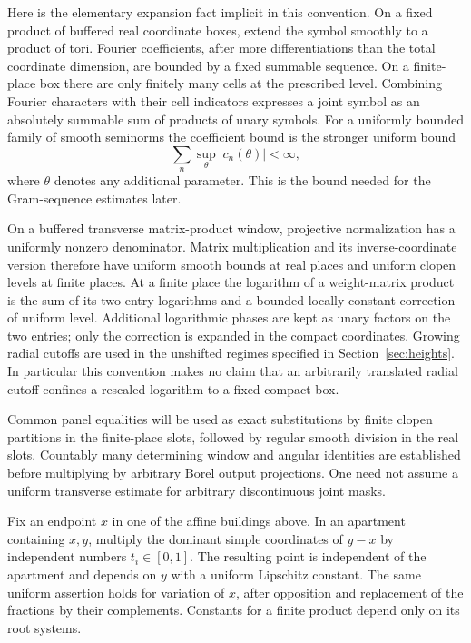 Here is the elementary expansion fact implicit in this convention.
On a fixed product of buffered real coordinate boxes, extend the
symbol smoothly to a product of tori.  Fourier coefficients, after
more differentiations than the total coordinate dimension, are
bounded by a fixed summable sequence.  On a finite-place box there
are only finitely many cells at the prescribed level.  Combining
Fourier characters with their cell indicators expresses a joint
symbol as an absolutely summable sum of products of unary symbols.
For a uniformly bounded family of smooth seminorms the coefficient
bound is the stronger uniform bound
\[
       \sum_n\sup_\theta |c_n(\theta)|<\infty,
\]
where $\theta$ denotes any additional parameter.  This is the bound
needed for the Gram-sequence estimates later.

On a buffered transverse matrix-product window, projective
normalization has a uniformly nonzero denominator.  Matrix
multiplication and its inverse-coordinate version therefore have
uniform smooth bounds at real places and uniform clopen levels at
finite places.  At a finite place the logarithm of a weight-matrix
product is the sum of its two entry logarithms and a bounded locally
constant correction of uniform level.  Additional logarithmic phases
are kept as unary factors on the two entries; only the correction is
expanded in the compact coordinates.  Growing radial cutoffs are
used in the unshifted regimes specified in
Section~\ref{sec:heights}.  In particular this convention makes no
claim that an arbitrarily translated radial cutoff confines a
rescaled logarithm to a fixed compact box.

Common panel equalities will be used as exact substitutions by finite
clopen partitions in the finite-place slots, followed by regular
smooth division in the real slots.  Countably many determining
window and angular identities are established before multiplying by
arbitrary Borel output projections.  One need not assume a uniform
transverse estimate for arbitrary discontinuous joint masks.

\begin{lemma}
\label{lem:setup-building-interpolation}
Fix an endpoint $x$ in one of the affine buildings above.  In an
apartment containing $x,y$, multiply the dominant simple coordinates
of $y-x$ by independent numbers $t_i\in[0,1]$.  The resulting point
is independent of the apartment and depends on $y$ with a uniform
Lipschitz constant.  The same uniform assertion holds for variation
of $x$, after opposition and replacement of the fractions by their
complements.  Constants for a finite product depend only on its root
systems.
\end{lemma}


